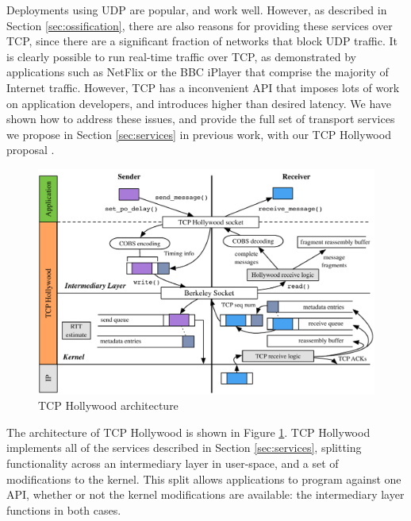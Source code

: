 \documentclass[10pt]{sig-alternate-05-2015}
\begin{document}

Deployments using UDP are popular, and work well. However, as described in
Section \ref{sec:ossification}, there are also reasons for providing these
services over TCP, since there are a significant fraction of networks that
block UDP traffic. It is clearly possible to run real-time traffic over
TCP, as demonstrated by applications such as NetFlix or the BBC iPlayer
that comprise the majority of Internet traffic. However, TCP has a
inconvenient API that imposes lots of work on application developers, and
introduces higher than desired latency. We have shown how to address these
issues, and provide the full set of transport services we propose in
Section \ref{sec:services} in previous work, with our TCP Hollywood
proposal \cite{mcquistin2016hollywood}.

\begin{figure}[t]
 \centering
 \includegraphics[scale=0.45]{figures/tcp-hollywood.pdf}
  \caption{TCP Hollywood architecture}
\label{diagram:tcp-hollywood}
\end{figure}

The architecture of TCP Hollywood is shown in Figure
\ref{diagram:tcp-hollywood}. TCP Hollywood implements all of the services
described in Section \ref{sec:services}, splitting functionality across
an intermediary layer in user-space, and a set of modifications to the
kernel. This split allows applications to program against one API, whether
or not the kernel modifications are available: the intermediary layer
functions in both cases.
\end{document}
